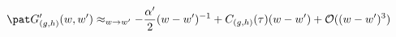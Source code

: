 \begin{equation}
   \pat G'_{(g,h)} (w,w') \approx_{w\rightarrow w'} -\frac{\alpha'}{2}(w-w')^{-1}
   + C_{(g,h)}(\tau) (w-w') + {\cal O}((w-w')^3)
\end{equation}

